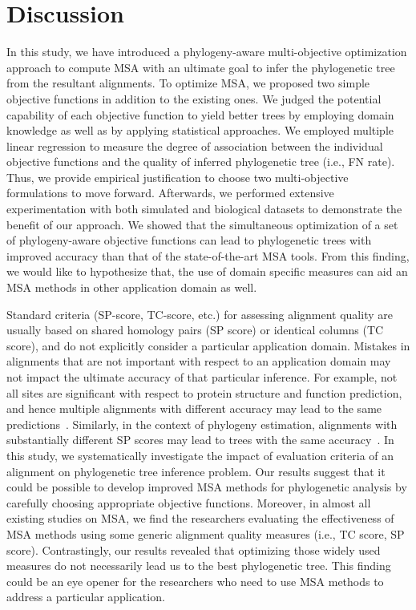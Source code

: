 \section{Discussion}
\label{sec:discussion}
In this study, we have introduced a phylogeny-aware multi-objective optimization approach to compute MSA with an ultimate goal to infer the phylogenetic tree from the resultant alignments. To optimize MSA, we proposed two simple objective functions in addition to the existing ones. We judged the potential capability of each objective function to yield better trees by employing domain knowledge as well as by applying statistical approaches. We employed multiple linear regression to measure the degree of association between the individual objective functions and the quality of inferred phylogenetic tree (i.e., FN rate). Thus, we provide empirical justification to choose two multi-objective formulations to move forward. Afterwards, we performed extensive experimentation with both simulated and biological datasets to demonstrate the benefit of our approach. We showed that the simultaneous optimization of a set of phylogeny-aware objective functions can lead to phylogenetic trees with improved accuracy than that of the state-of-the-art MSA tools. From this finding, we would like to hypothesize that, the use of domain specific measures can aid an MSA methods in other application domain as well.

Standard criteria (SP-score, TC-score, etc.) for assessing alignment quality are usually based on shared homology pairs (SP score) or identical columns (TC score), and do not explicitly consider a particular application domain. Mistakes in alignments that are not important with respect to an application domain may not impact the ultimate accuracy of that particular inference. For example, not all sites are significant with respect to protein structure and function prediction, and hence multiple alignments with different accuracy may lead to the same predictions~\citep{warnow2013large}. Similarly, in the context of phylogeny estimation, alignments with substantially different SP scores may lead to trees with the same accuracy~\citep{liu2009rapid}. In this study, we systematically investigate the impact of evaluation criteria of an alignment on phylogenetic tree inference problem. Our results suggest that it could be possible to develop improved MSA methods for phylogenetic analysis by carefully choosing appropriate objective functions. Moreover, in almost all existing studies on MSA, we find the researchers evaluating the effectiveness of MSA methods using some generic alignment quality measures (i.e., TC score, SP score). Contrastingly, our results revealed that optimizing those widely used measures do not necessarily lead us to the best phylogenetic tree. This finding could be an eye opener for the researchers who need to use MSA methods to address a particular application. 

